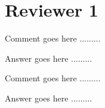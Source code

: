 %
%
\section*{Reviewer 1}
%
%
\begin{ReviewerComment}{1}
Comment goes here .........\end{ReviewerComment}
\begin{Answer}
Answer goes here .........
\end{Answer}

\begin{ReviewerComment}{1}
Comment goes here .........\end{ReviewerComment}
\begin{Answer}
Answer goes here .........
\end{Answer}